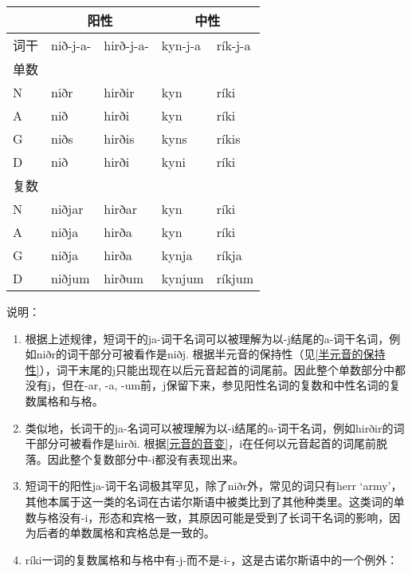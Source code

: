 \begin{longtable}{lllll}
  \toprule
       & \multicolumn{2}{c}{阳性} & \multicolumn{2}{c}{中性}                     \\
  \midrule
  \endhead
  \bottomrule
  \endfoot
  词干 & nið-j-a-                 & hirð-j-a-                & kyn-j-a & rík-j-a \\
  单数 &                          &                          &         &         \\
  N    & niðr                     & hirðir                   & kyn     & ríki    \\
  A    & nið                      & hirði                    & kyn     & ríki    \\
  G    & niðs                     & hirðis                   & kyns    & ríkis   \\
  D    & nið                      & hirði                    & kyni    & ríki    \\
  复数 &                          &                          &         &         \\
  N    & niðjar                   & hirðar                   & kyn     & ríki    \\
  A    & niðja                    & hirða                    & kyn     & ríki    \\
  G    & niðja                    & hirða                    & kynja   & ríkja   \\
  D    & niðjum                   & hirðum                   & kynjum  & ríkjum  \\
\end{longtable}

说明：

\begin{enumerate}
  \def\labelenumi{\arabic{enumi})}
  \item
        根据上述规律，短词干的ja-词干名词可以被理解为以-j结尾的a-词干名词，例如niðr的词干部分可被看作是niðj.
        根据半元音的保持性（见\ref{半元音的保持性}），词干末尾的j只能出现在以后元音起首的词尾前。因此整个单数部分中都没有j，但在-ar,
        -a, -um前，j保留下来，参见阳性名词的复数和中性名词的复数属格和与格。
  \item
        类似地，长词干的ja-名词可以被理解为以-i结尾的a-词干名词，例如hirðir的词干部分可被看作是hirði.
        根据\ref{元音的音变}，i在任何以元音起首的词尾前脱落。因此整个复数部分中-i都没有表现出来。
  \item
        短词干的阳性ja-词干名词极其罕见，除了niðr外，常见的词只有herr
        `army'，其他本属于这一类的名词在古诺尔斯语中被类比到了其他种类里。这类词的单数与格没有-i，形态和宾格一致，其原因可能是受到了长词干名词的影响，因为后者的单数属格和宾格总是一致的。
  \item
        ríki一词的复数属格和与格中有-j-而不是-i-，这是古诺尔斯语中的一个例外：
\end{enumerate}

